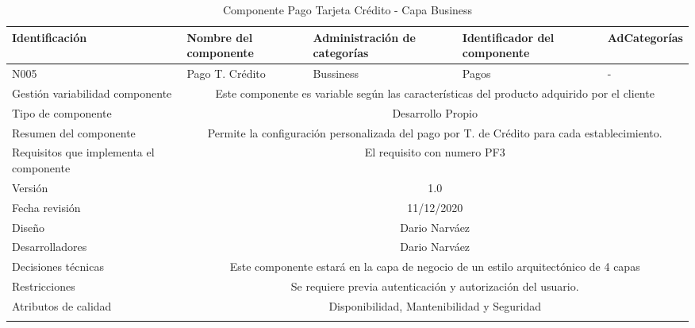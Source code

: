 \documentclass[10pt,a4paper,openany]{book}
\begin{document}
\begin{longtable}{|p{3cm}|p{3cm}|p{3cm}|p{3cm}|p{3cm}|} \hline
Identificación & Nombre del componente & Administración de categorías & Identificador del componente & AdCategorías \\[0.5ex] \hline
N005& Pago T. Crédito& Bussiness& Pagos& -\\[0.5ex] \hline
Gestión variabilidad componente & \multicolumn{4}{|c|}{Este componente es variable según las características del producto adquirido por el cliente} \\ \hline
Tipo de componente & \multicolumn{4}{|c|}{Desarrollo Propio} \\ \hline
Resumen del componente & \multicolumn{4}{|c|}{Permite la configuración personalizada del pago por T. de Crédito para cada establecimiento.} \\ \hline
Requisitos que implementa el componente & \multicolumn{4}{|c|}{El requisito con numero PF3 } \\ \hline
Versión & \multicolumn{4}{|c|}{1.0 } \\ \hline
Fecha revisión & \multicolumn{4}{|c|}{ 11/12/2020} \\ \hline
Diseño & \multicolumn{4}{|c|}{Dario Narváez} \\ \hline
Desarrolladores & \multicolumn{4}{|c|}{Dario Narváez} \\ \hline
Decisiones técnicas & \multicolumn{4}{|c|}{Este componente estará en la capa de negocio de un estilo arquitectónico de 4 capas  } \\ \hline
Restricciones & \multicolumn{4}{|c|}{Se requiere previa autenticación y autorización del usuario.} \\ \hline
Atributos de calidad & \multicolumn{4}{|c|}{Disponibilidad, Mantenibilidad y Seguridad} \\ \hline
\caption{Componente Pago Tarjeta Crédito - Capa Business}
\label{table:t6}
\end{longtable}
\end{document}
